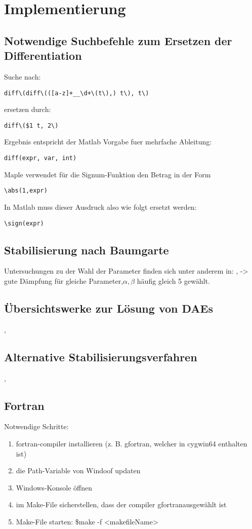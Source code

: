 \chapter{Implementierung}\label{ch:implement}

\section{Notwendige Suchbefehle zum Ersetzen der Differentiation}
Suche nach: \begin{lstlisting}
diff\(diff\(([a-z]+__\d+\(t\),) t\), t\)
\end{lstlisting} 

ersetzen durch: 
\begin{lstlisting} 
diff\($1 t, 2\)
\end{lstlisting} 

Ergebnis entspricht der Matlab Vorgabe fuer mehrfache Ableitung: 
\begin{lstlisting}
diff(expr, var, int)
\end{lstlisting}

Maple verwendet f\"ur die Signum-Funktion den Betrag in der Form
\begin{lstlisting}
\abs(1,expr)
\end{lstlisting}
In Matlab muss dieser Ausdruck also wie folgt ersetzt werden:
\begin{lstlisting}
\sign(expr)
\end{lstlisting}

\section{Stabilisierung nach Baumgarte}
Untersuchungen zu der Wahl der Parameter finden sich unter anderem in:
, \cite{Flores2011}-> gute D\"ampfung f\"ur gleiche Parameter,\cite{Neto2003}$\alpha, \beta$ h\"aufig gleich 5 gew\"ahlt.

\section{\"Ubersichtswerke zur L\"osung von DAEs}
\cite{Haug1991}, \cite{ErnstHairer2010}

\section{Alternative Stabilisierungsverfahren}
\cite{Park1988},\cite{Cline2003}

\section{Fortran}
Notwendige Schritte:
\begin{enumerate}
\item fortran-compiler installieren (z. B. gfortran, welcher in cygwin64 enthalten ist)
\item die Path-Variable von Windoof updaten
\item Windows-Konsole \"offnen
\item im Make-File sicherstellen, dass der compiler \glqq gfortran\grqq ausgew\"ahlt ist
\item Make-File starten: \$make -f <makefileName>
\end{enumerate}